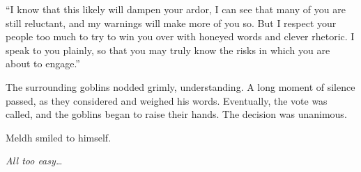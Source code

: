 “I know that this likely will dampen your ardor, I can see that many of you are still reluctant, and my warnings will make more of you so. But I respect your people too much to try to win you over with honeyed words and clever rhetoric. I speak to you plainly, so that you may truly know the risks in which you are about to engage.”

The surrounding goblins nodded grimly, understanding. A long moment of silence passed, as they considered and weighed his words. Eventually, the vote was called, and the goblins began to raise their hands. The decision was unanimous.

Meldh smiled to himself.

\emph{All too easy…}